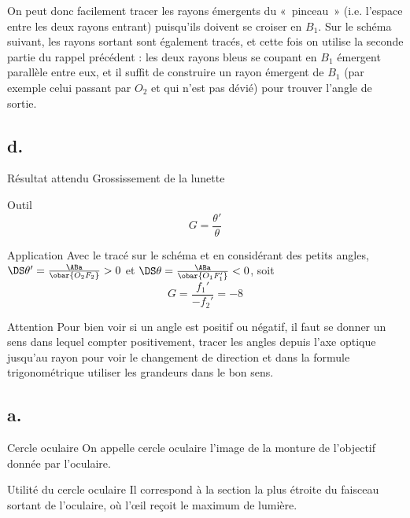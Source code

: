 \documentclass[../main/main.tex]{subfiles}
\begin{document}
On peut donc facilement tracer les rayons émergents du «~pinceau~» (i.e.
l'espace entre les deux rayons entrant) puisqu'ils doivent se croiser en $B_1$.
Sur le schéma suivant, les rayons sortant sont également tracés, et cette fois
on utilise la seconde partie du rappel précédent : les deux rayons bleus se
coupant en $B_1$ émergent parallèle entre eux, et il suffit de construire un
rayon émergent de $B_1$ (par exemple celui passant par $O_2$ et qui n'est pas
dévié) pour trouver l'angle de sortie.

\begin{center}
    
\end{center}

\setcounter{subsection}{1}
\subsection{d.}
\begin{tcbraster}[raster columns=6, raster equal height=rows]
    \begin{NCprop}{Résultat attendu}
        Grossissement de la lunette
    \end{NCprop}
    \begin{NCdemo}{Outil}
        \[ G = \frac{\theta'}{\theta}\]
    \end{NCdemo}
    \begin{NCexem}[raster multicolumn=2]{Application}
        Avec le tracé sur le schéma et en considérant des petits angles,
        $\DS \theta' = \frac{\ABa}{\obar{O_2F_2}} > 0$ et $\DS \theta =
        \frac{\ABa}{\obar{O_1F_1'}} < 0$, soit \[ G = \frac{f_1'}{-f_2'} = -8\]
    \end{NCexem}
    \begin{NCimpo}[raster multicolumn=2]{Attention}
        Pour bien voir si un angle est positif ou négatif, il faut se donner un
        sens dans lequel compter positivement, tracer les angles depuis l'axe
        optique jusqu'au rayon pour voir le changement de direction et dans la
        formule trigonométrique utiliser les grandeurs dans le bon sens.
    \end{NCimpo}
\end{tcbraster}

\subsection{a.}
\begin{tcbraster}[raster columns=2, raster equal height=rows]
    \begin{defi}{Cercle oculaire}
        On appelle cercle oculaire l'image de la monture de l'objectif donnée par
        l'oculaire.
    \end{defi}
    \begin{inte}{Utilité du cercle oculaire}
        Il correspond à la section la plus étroite du faisceau sortant de
        l'oculaire, où l'œil reçoit le maximum de lumière.  
    \end{inte}
\end{tcbraster}
\end{document}
